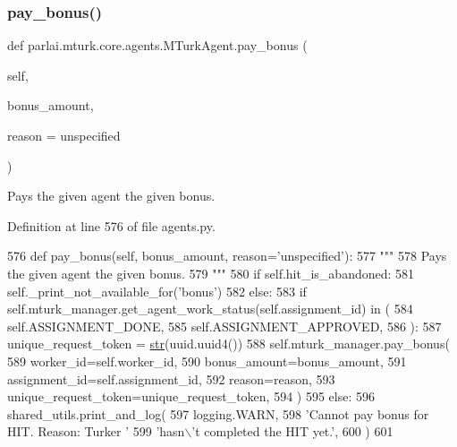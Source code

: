 \subsubsection{\texorpdfstring{pay\+\_\+bonus()}{pay\_bonus()}}
{\footnotesize\ttfamily def parlai.\+mturk.\+core.\+agents.\+M\+Turk\+Agent.\+pay\+\_\+bonus (\begin{DoxyParamCaption}\item[{}]{self,  }\item[{}]{bonus\+\_\+amount,  }\item[{}]{reason = {\ttfamily \textquotesingle{}unspecified\textquotesingle{}} }\end{DoxyParamCaption})}

\begin{DoxyVerb}Pays the given agent the given bonus.
\end{DoxyVerb}
 

Definition at line 576 of file agents.\+py.


\begin{DoxyCode}
576     \textcolor{keyword}{def }pay\_bonus(self, bonus\_amount, reason='unspecified'):
577         \textcolor{stringliteral}{"""}
578 \textcolor{stringliteral}{        Pays the given agent the given bonus.}
579 \textcolor{stringliteral}{        """}
580         \textcolor{keywordflow}{if} self.hit\_is\_abandoned:
581             self.\_print\_not\_available\_for(\textcolor{stringliteral}{'bonus'})
582         \textcolor{keywordflow}{else}:
583             \textcolor{keywordflow}{if} self.mturk\_manager.get\_agent\_work\_status(self.assignment\_id) \textcolor{keywordflow}{in} (
584                 self.ASSIGNMENT\_DONE,
585                 self.ASSIGNMENT\_APPROVED,
586             ):
587                 unique\_request\_token = \hyperlink{namespacegenerate__task__READMEs_a5b88452ffb87b78c8c85ececebafc09f}{str}(uuid.uuid4())
588                 self.mturk\_manager.pay\_bonus(
589                     worker\_id=self.worker\_id,
590                     bonus\_amount=bonus\_amount,
591                     assignment\_id=self.assignment\_id,
592                     reason=reason,
593                     unique\_request\_token=unique\_request\_token,
594                 )
595             \textcolor{keywordflow}{else}:
596                 shared\_utils.print\_and\_log(
597                     logging.WARN,
598                     \textcolor{stringliteral}{'Cannot pay bonus for HIT. Reason: Turker '}
599                     \textcolor{stringliteral}{'hasn\(\backslash\)'t completed the HIT yet.'},
600                 )
601 
\end{DoxyCode}
\mbox{\label{classparlai_1_1mturk_1_1core_1_1agents_1_1MTurkAgent_a547ab71740a8dccd4a94150109876c9c}} 
